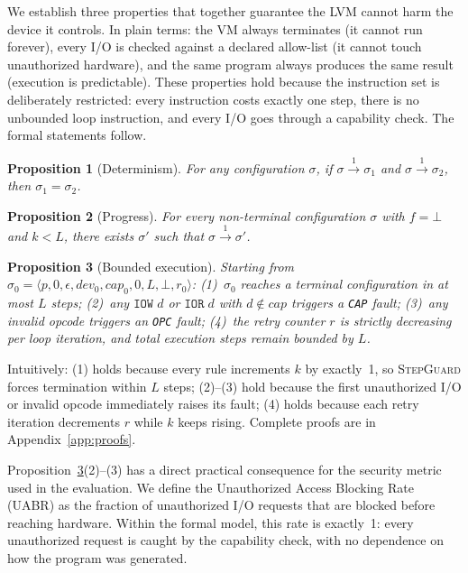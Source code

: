\documentclass[a4paper,fleqn,longmktitle]{cas-dc}
\newtheorem{proposition}{Proposition}
\begin{document}
We establish three properties that together guarantee the LVM cannot harm the device it controls. In plain terms: the VM always terminates (it cannot run forever), every I/O is checked against a declared allow-list (it cannot touch unauthorized hardware), and the same program always produces the same result (execution is predictable). These properties hold because the instruction set is deliberately restricted: every instruction costs exactly one step, there is no unbounded loop instruction, and every I/O goes through a capability check. The formal statements follow.

\begin{proposition}[Determinism]
\label{thm:determinism}
For any configuration $\sigma$, if $\sigma \xrightarrow{1} \sigma_1$ and $\sigma \xrightarrow{1} \sigma_2$, then $\sigma_1 = \sigma_2$.
\end{proposition}

\begin{proposition}[Progress]
\label{thm:progress}
For every non-terminal configuration $\sigma$ with $f = \bot$ and $k < L$, there exists $\sigma'$ such that $\sigma \xrightarrow{1} \sigma'$.
\end{proposition}

\begin{proposition}[Bounded execution]
\label{thm:bounded}
Starting from $\sigma_0 = \langle p, 0, \epsilon, \mathit{dev}_0, \mathit{cap}_0, 0, L, \bot, r_0 \rangle$: (1)~$\sigma_0$ reaches a terminal configuration in at most $L$ steps; (2)~any $\texttt{IOW}\;d$ or $\texttt{IOR}\;d$ with $d \notin \mathit{cap}$ triggers a \texttt{CAP} fault; (3)~any invalid opcode triggers an \texttt{OPC} fault; (4)~the retry counter $r$ is strictly decreasing per loop iteration, and total execution steps remain bounded by $L$.
\end{proposition}

\noindent Intuitively: (1) holds because every rule increments $k$ by exactly~1, so \textsc{StepGuard} forces termination within $L$ steps; (2)--(3) hold because the first unauthorized I/O or invalid opcode immediately raises its fault; (4) holds because each retry iteration decrements $r$ while $k$ keeps rising. Complete proofs are in Appendix~\ref{app:proofs}.

Proposition~\ref{thm:bounded}(2)--(3) has a direct practical consequence for the security metric used in the evaluation. We define the Unauthorized Access Blocking Rate (UABR) as the fraction of unauthorized I/O requests that are blocked before reaching hardware. Within the formal model, this rate is exactly~1: every unauthorized request is caught by the capability check, with no dependence on how the program was generated.
\end{document}
